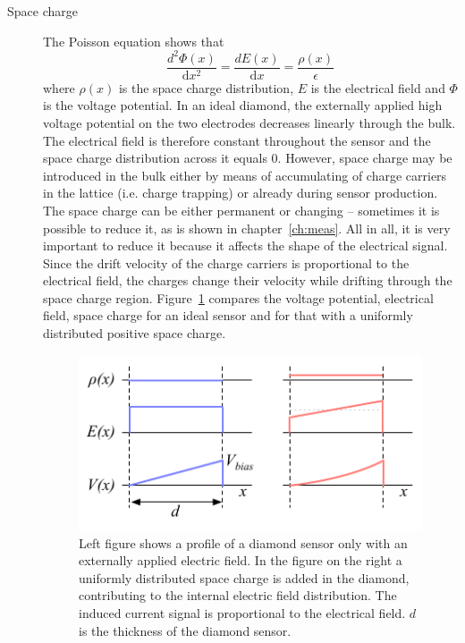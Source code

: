 \begin{description}
\item[Space charge] 
The Poisson equation shows that 
\begin{equation}
\label{eq:poisson}
\frac{d^2\Phi(x)}{\mathrm{d}x^2} = \frac{dE(x)}{\mathrm{d}x} = \frac{\rho(x)}{\epsilon}
\end{equation}
where $\rho(x)$ is the space charge distribution, $E$ is the electrical field and $\Phi$ is the voltage potential. In an ideal diamond, the externally applied high voltage potential on the two electrodes decreases linearly through the bulk. The electrical field is therefore constant throughout the sensor and the space charge distribution across it equals 0. However, space charge may be introduced in the bulk either by means of accumulating of charge carriers in the lattice (i.e. charge trapping) or already during sensor production. The space charge can be either permanent or changing -- sometimes it is possible to reduce it, as is shown in chapter~\ref{ch:meas}. All in all, it is very important to reduce it because it affects the shape of the electrical signal. Since the drift velocity of the charge carriers is proportional to the electrical field, the charges change their velocity while drifting through the space charge region. Figure~\ref{fig:spcchg} compares the voltage potential, electrical field, space charge for an ideal sensor and for that with a uniformly distributed positive space charge.
\begin{figure}[!t]
\begin{center}
\includegraphics[width=0.6\linewidth]{02_pulse_formation/pics/plots/spcchg}
\caption{Left figure shows a profile of a diamond sensor only with an externally applied electric field. In the figure on the right a uniformly distributed space charge is added in the diamond, contributing to  the internal electric field distribution. The induced current signal is proportional to the electrical field. $d$ is the thickness of the diamond sensor.}
\label{fig:spcchg}
\end{center}
\end{figure}



\end{description}
